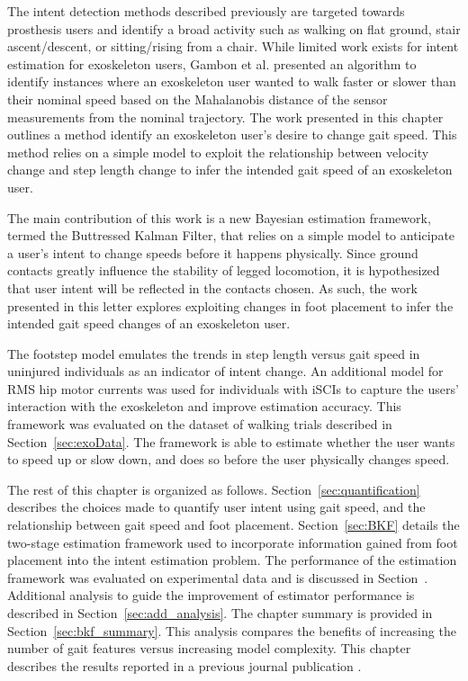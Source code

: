 The intent detection methods described previously are targeted towards prosthesis users and identify a broad activity such as walking on flat ground, stair ascent/descent, or sitting/rising from a chair. While limited work exists for intent estimation for exoskeleton users, Gambon et al. presented an algorithm \cite{Gambon20b} to identify instances where an exoskeleton user wanted to walk faster or slower than their nominal speed based on the Mahalanobis distance of the sensor measurements from the nominal trajectory. The work presented in this chapter outlines a method identify an exoskeleton user's desire to change gait speed. This method relies on a simple model to exploit the relationship between velocity change and step length change to infer the intended gait speed of an exoskeleton user.

The main contribution of this work is a new Bayesian estimation framework, termed the Buttressed Kalman Filter, that relies on a simple model to anticipate a user's intent to change speeds before it happens physically. Since ground contacts greatly influence the stability of legged locomotion, it is hypothesized that user intent will be reflected in the contacts chosen. As such, the work presented in this letter explores exploiting changes in foot placement to infer the intended gait speed changes of an exoskeleton user. 

The footstep model emulates the trends in step length versus gait speed in uninjured individuals as an indicator of intent change. An additional model for RMS hip motor currents was used for individuals with iSCIs to capture the users' interaction with the exoskeleton and improve estimation accuracy. This framework was evaluated on the dataset of walking trials described in Section~\ref{sec:exoData}. The framework is able to estimate whether the user wants to speed up or slow down, and does so before the user physically changes speed.

The rest of this chapter is organized as follows. Section~\ref{sec:quantification} describes the choices made to quantify user intent using gait speed, and the relationship between gait speed and foot placement. Section~\ref{sec:BKF} details the two-stage estimation framework used to incorporate information gained from foot placement into the intent estimation problem. The performance of the estimation framework was evaluated on experimental data and is discussed in Section~\label{sec:bkf_results}. Additional analysis to guide the improvement of estimator performance is described in Section~\ref{sec:add_analysis}. The chapter summary is provided in Section~\ref{sec:bkf_summary}. This analysis compares the benefits of increasing the number of gait features versus increasing model complexity. This chapter describes the results reported in a previous journal publication \cite{karulkar2021using}.


